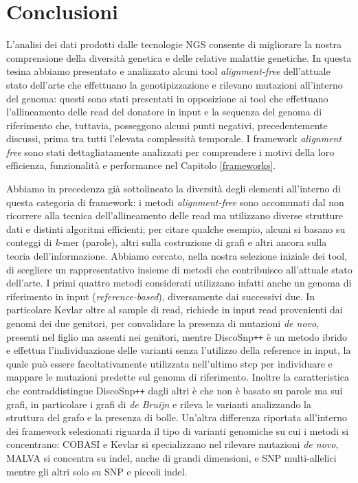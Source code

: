 \documentclass[../main.tex]{subfiles}
\begin{document}
\section{Conclusioni}

L'analisi dei dati prodotti dalle tecnologie NGS consente di migliorare la nostra comprensione della diversità genetica e delle relative malattie genetiche. In questa tesina abbiamo presentato e analizzato alcuni tool \textit{alignment-free} dell'attuale stato dell'arte che effettuano la genotipizzazione e rilevano mutazioni all'interno del genoma: questi sono stati presentati in opposizione ai tool che effettuano l'allineamento delle read del donatore in input e la sequenza del genoma di riferimento che, tuttavia, posseggono alcuni punti negativi, precedentemente discussi, prima tra tutti l'elevata complessità temporale. I framework \textit{alignment free} sono stati dettagliatamente analizzati per comprendere i motivi della loro efficienza, funzionalità e performance nel Capitolo \ref{frameworks}.

Abbiamo in precedenza già sottolineato la diversità degli elementi all'interno di questa categoria di framework: i metodi \textit{alignment-free} sono accomunati dal non ricorrere alla tecnica dell'allineamento delle read ma utilizzano diverse strutture dati e distinti algoritmi efficienti; per citare qualche esempio, alcuni si basano su conteggi di \textit{k}-mer (parole), altri sulla costruzione di grafi e altri ancora sulla teoria dell'informazione. Abbiamo cercato, nella nostra selezione iniziale dei tool, di scegliere un rappresentativo insieme di metodi che contribuisco all'attuale stato dell'arte. I primi quattro metodi considerati utilizzano infatti anche un genoma di riferimento in input (\textit{reference-based}), diversamente dai successivi due. In particolare Kevlar \cite{standage2019kevlar} oltre al sample di read, richiede in input read provenienti dai genomi dei due genitori, per convalidare la presenza di mutazioni \textit{de novo}, presenti nel figlio ma assenti nei genitori, mentre DiscoSnp\texttt{++} \cite{peterlongo2017discosnp++} è un metodo ibrido e effettua l'individuazione delle varianti senza l'utilizzo della reference in input, la quale può essere facoltativamente utilizzata nell'ultimo step per individuare e mappare le mutazioni predette sul genoma di riferimento. Inoltre la caratteristica che contraddistingue DiscoSnp\texttt{++} dagli altri è che non è basato su parole ma sui grafi, in particolare i grafi di \textit{de Bruijn} e rileva le varianti analizzando la struttura del grafo e la presenza di bolle. Un'altra differenza riportata all'interno dei framework selezionati riguarda il tipo di varianti genomiche su cui i metodi si concentrano: COBASI \cite{gomez-romero2018cobasi} e Kevlar si specializzano nel rilevare mutazioni \textit{de novo}, MALVA  \cite{bernardini2019malva} si concentra su indel, anche di grandi dimensioni, e SNP multi-allelici mentre gli altri solo su SNP e piccoli indel.
\end{document}
